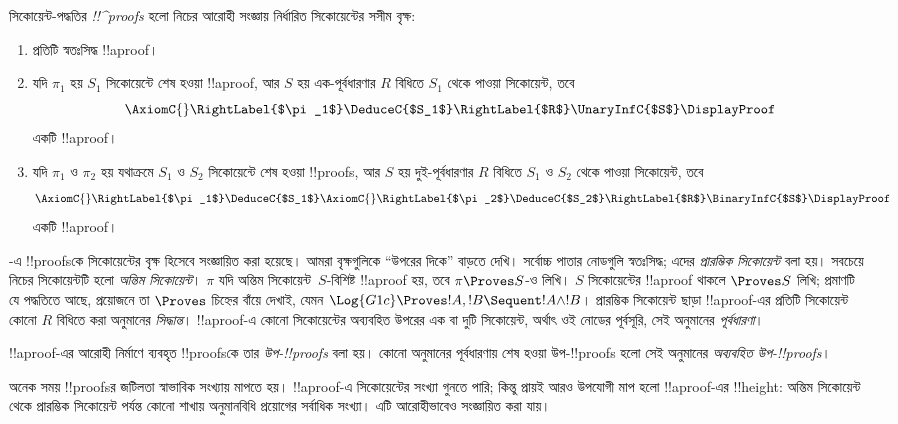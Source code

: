 \documentclass[../../../include/open-logic-section]{subfiles}
\begin{document}
\begin{defn}
সিকোয়েন্ট-পদ্ধতির \emph{!!^{proof}s} হলো নিচের
আরোহী সংজ্ঞায় নির্ধারিত সিকোয়েন্টের সসীম বৃক্ষ:
\begin{enumerate}
  \item{} প্রতিটি স্বতঃসিদ্ধ !!a{proof}।
  \item{} যদি $\pi_1$ হয়
  $S_1$ সিকোয়েন্টে শেষ হওয়া !!a{proof}, আর $S$ হয়
  এক-পূর্বধারণার $R$ বিধিতে $S_1$ থেকে পাওয়া
  সিকোয়েন্ট, তবে
  \[
    \AxiomC{}
    \RightLabel{$\pi_1$}
    \DeduceC{$S_1$}
    \RightLabel{$R$}
    \UnaryInfC{$S$}
    \DisplayProof
    \]
  একটি !!a{proof}।
  \item{} যদি $\pi_1$ ও
  $\pi_2$ হয় যথাক্রমে $S_1$ ও $S_2$ সিকোয়েন্টে
  শেষ হওয়া !!{proof}s, আর $S$ হয় দুই-পূর্বধারণার
  $R$ বিধিতে $S_1$ ও $S_2$ থেকে পাওয়া সিকোয়েন্ট,
  তবে
  \[
    \AxiomC{}
    \RightLabel{$\pi_1$}
    \DeduceC{$S_1$}
    \AxiomC{}
    \RightLabel{$\pi_2$}
    \DeduceC{$S_2$}
    \RightLabel{$R$}
    \BinaryInfC{$S$}
    \DisplayProof
    \]
  একটি !!a{proof}।
\end{enumerate}
\end{defn}

-এ !!{proof}sকে সিকোয়েন্টের
বৃক্ষ হিসেবে সংজ্ঞায়িত করা হয়েছে। আমরা বৃক্ষগুলিকে
“উপরের দিকে” বাড়তে দেখি। সর্বোচ্চ পাতার নোডগুলি
স্বতঃসিদ্ধ; এদের \emph{প্রারম্ভিক সিকোয়েন্ট} বলা হয়।
সবচেয়ে নিচের সিকোয়েন্টটি হলো \emph{অন্তিম সিকোয়েন্ট}।
$\pi$ যদি অন্তিম সিকোয়েন্ট~$S$-বিশিষ্ট !!a{proof} হয়,
তবে $\pi \Proves S$-ও লিখি। $S$ সিকোয়েন্টের
!!a{proof} থাকলে $\Proves S$ লিখি; প্রমাণটি যে
পদ্ধতিতে আছে, প্রয়োজনে তা $\Proves$ চিহ্নের বাঁয়ে
দেখাই, যেমন $\Log{G1c} \Proves !A, !B \Sequent !A \land
!B$। প্রারম্ভিক সিকোয়েন্ট ছাড়া !!a{proof}-এর
প্রতিটি সিকোয়েন্ট কোনো $R$ বিধিতে করা অনুমানের
\emph{সিদ্ধান্ত}। !!a{proof}-এ কোনো সিকোয়েন্টের অব্যবহিত উপরের
এক বা দুটি সিকোয়েন্ট, অর্থাৎ ওই নোডের পূর্বসূরি,
সেই অনুমানের \emph{পূর্বধারণা}।

!!a{proof}-এর আরোহী নির্মাণে ব্যবহৃত
!!{proof}sকে তার \emph{উপ-!!{proof}s} বলা হয়।
কোনো অনুমানের পূর্বধারণায় শেষ হওয়া
উপ-!!{proof}s হলো সেই অনুমানের
\emph{অব্যবহিত উপ-!!{proof}s}।

অনেক সময় !!{proof}sর জটিলতা স্বাভাবিক
সংখ্যায় মাপতে হয়। !!a{proof}-এ সিকোয়েন্টের
সংখ্যা গুনতে পারি; কিন্তু প্রায়ই আরও উপযোগী মাপ
হলো !!a{proof}-এর !!{height}: অন্তিম সিকোয়েন্ট
থেকে প্রারম্ভিক সিকোয়েন্ট পর্যন্ত কোনো শাখায়
অনুমানবিধি প্রয়োগের সর্বাধিক সংখ্যা।
এটি আরোহীভাবেও সংজ্ঞায়িত করা যায়।
\end{document}
